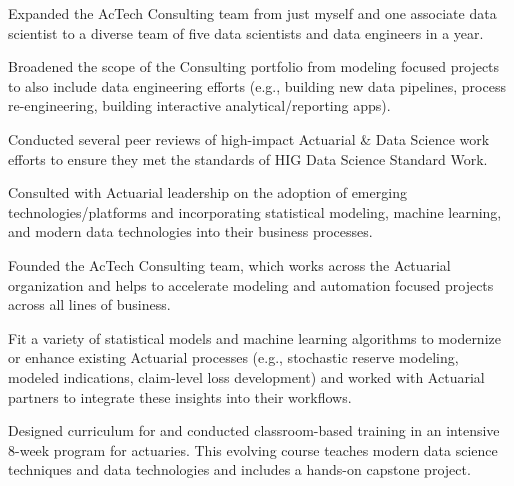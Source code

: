 \documentclass[letterpaper]{deedy-resume} %
\begin{document}
\begin{minipage}[t]{0.68\textwidth}
  \hfill
  \begin{tightitemize}
  \item  Expanded the AcTech Consulting team from just myself and one
    associate data scientist to a diverse team of five data scientists
    and data engineers in a year. 
  \item Broadened the scope of the Consulting portfolio from modeling focused projects to
    also include data engineering efforts (e.g., building new data
    pipelines, process re-engineering, building interactive
    analytical/reporting apps).
  \item Conducted several peer reviews of high-impact Actuarial \&
    Data Science work efforts to ensure they met the standards of HIG
   Data Science Standard Work.
  \item Consulted with Actuarial leadership on the adoption of emerging
    technologies/platforms and incorporating statistical modeling,
    machine learning, and modern data technologies into their business
    processes.
  \end{tightitemize}
  \sectionspace

  \hfill
  \begin{tightitemize}
  \item   Founded the AcTech Consulting team, which works across the Actuarial
    organization and helps to accelerate modeling and automation
    focused projects across all lines of business. 
  \item Fit a variety of statistical models and machine learning
    algorithms to modernize or enhance existing Actuarial processes
    (e.g., stochastic reserve modeling, modeled indications, claim-level
    loss development) and worked with Actuarial partners to integrate
    these insights into their workflows.
  \item Designed curriculum for and conducted classroom-based training in an
    intensive 8-week program for actuaries. This evolving course teaches modern data
    science techniques and data technologies and includes a hands-on
    capstone project.
  \end{tightitemize}
  \sectionspace

  


\end{minipage} %
\newpage
\end{document}
